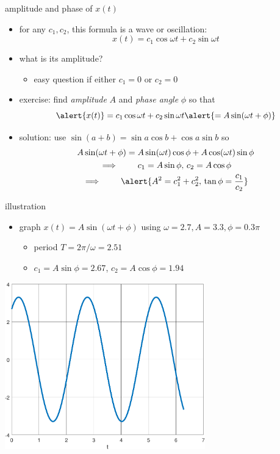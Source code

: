\documentclass[urlcolor=blue]{beamer}
\begin{document}
\begin{frame}{amplitude and phase of $x(t)$}

\begin{itemize}
\item for any $c_1,c_2$, this formula is a wave or oscillation:
    $$x(t) = c_1 \cos \omega t + c_2 \sin \omega t$$
\item what is its amplitude?
    \begin{itemize}
    \item easy question if either $c_1 =0$ or $c_2=0$
    \end{itemize}
\item exercise: find  \emph{amplitude} $A$ and \emph{phase angle} $\phi$ so that
    $$\alert{x(t)} = c_1 \cos \omega t + c_2 \sin \omega t \alert{= A \sin(\omega t + \phi)}$$
\item solution: use $\sin(a+b) = \sin a \cos b + \cos a \sin b$ so
\begin{gather*}
A \sin(\omega t + \phi) = A \sin(\omega t) \cos\phi + A \cos(\omega t) \sin\phi \\
\implies \qquad c_1 = A \sin\phi, \, c_2 = A \cos \phi \\
\implies \qquad \alert{A^2 = c_1^2 + c_2^2, \, \tan \phi = \frac{c_1}{c_2}}
\end{gather*}
\end{itemize}
\end{frame}


\begin{frame}{illustration}

\begin{itemize}
\item graph $x(t) = A \sin(\omega t + \phi)$ using $\omega=2.7,A=3.3,\phi=0.3 \pi$
    \begin{itemize}
    \item period $T=2\pi/\omega = 2.51$
    \item $c_1 = A \sin \phi = 2.67$, $c_2 = A \cos \phi = 1.94$
    \end{itemize}
\end{itemize}

\hfill \includegraphics[width=0.65\textwidth]{figs/altwave}
\end{frame}
\end{document}
